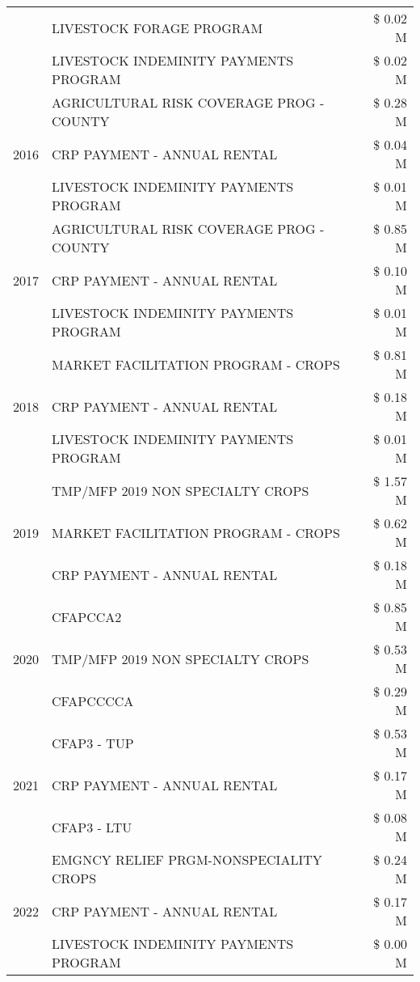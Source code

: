 \begin{tabular}{llr}
 & LIVESTOCK FORAGE PROGRAM & \$ 0.02 M \\
 & LIVESTOCK INDEMINITY PAYMENTS PROGRAM & \$ 0.02 M \\
\cline{1-3}
\multirow[t]{3}{*}{2016} & AGRICULTURAL RISK COVERAGE PROG - COUNTY & \$ 0.28 M \\
 & CRP PAYMENT - ANNUAL RENTAL & \$ 0.04 M \\
 & LIVESTOCK INDEMINITY PAYMENTS PROGRAM & \$ 0.01 M \\
\cline{1-3}
\multirow[t]{3}{*}{2017} & AGRICULTURAL RISK COVERAGE PROG - COUNTY & \$ 0.85 M \\
 & CRP PAYMENT - ANNUAL RENTAL & \$ 0.10 M \\
 & LIVESTOCK INDEMINITY PAYMENTS PROGRAM & \$ 0.01 M \\
\cline{1-3}
\multirow[t]{3}{*}{2018} & MARKET FACILITATION PROGRAM - CROPS & \$ 0.81 M \\
 & CRP PAYMENT - ANNUAL RENTAL & \$ 0.18 M \\
 & LIVESTOCK INDEMINITY PAYMENTS PROGRAM & \$ 0.01 M \\
\cline{1-3}
\multirow[t]{3}{*}{2019} & TMP/MFP 2019 NON SPECIALTY CROPS & \$ 1.57 M \\
 & MARKET FACILITATION PROGRAM - CROPS & \$ 0.62 M \\
 & CRP PAYMENT - ANNUAL RENTAL & \$ 0.18 M \\
\cline{1-3}
\multirow[t]{3}{*}{2020} & CFAPCCA2 & \$ 0.85 M \\
 & TMP/MFP 2019 NON SPECIALTY CROPS & \$ 0.53 M \\
 & CFAPCCCCA & \$ 0.29 M \\
\cline{1-3}
\multirow[t]{3}{*}{2021} & CFAP3 - TUP & \$ 0.53 M \\
 & CRP PAYMENT - ANNUAL RENTAL & \$ 0.17 M \\
 & CFAP3 - LTU & \$ 0.08 M \\
\cline{1-3}
\multirow[t]{3}{*}{2022} & EMGNCY RELIEF PRGM-NONSPECIALITY CROPS & \$ 0.24 M \\
 & CRP PAYMENT - ANNUAL RENTAL & \$ 0.17 M \\
 & LIVESTOCK INDEMINITY PAYMENTS PROGRAM & \$ 0.00 M \\
\cline{1-3}
\bottomrule
\end{tabular}
